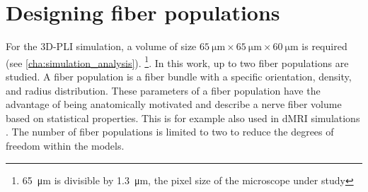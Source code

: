\section{Designing fiber populations}
%
For the \ac{3D-PLI} simulation, a volume of size $\SI{65}{\micro\meter} \times \SI{65}{\micro\meter} \times \SI{60}{\micro\meter}$ is required (see \cref{cha:simulation_analysis}). \footnote{\SI{65}{\micro\meter} is divisible by \SI{1.3}{\micro\meter}, the pixel size of the microscope under study}.
In this work, up to two fiber populations are studied.
A fiber population is a fiber bundle with a specific orientation, density, and radius distribution.
These parameters of a fiber population have the advantage of being anatomically motivated and describe a nerve fiber volume based on statistical properties.
This is for example also used in \ac{dMRI} simulations \cite{Ginsburger2018,Ginsburger2019,ginsburgerDis2019}.
The number of fiber populations is limited to two to reduce the degrees of freedom within the models.
%
% 
% 

